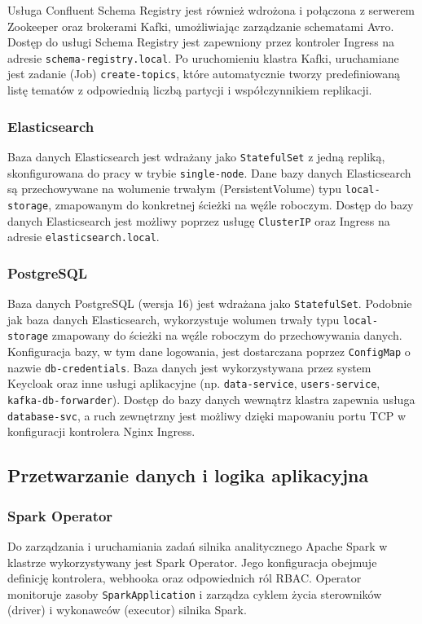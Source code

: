 Usługa Confluent Schema Registry jest również wdrożona i połączona z serwerem Zookeeper oraz brokerami Kafki, umożliwiając zarządzanie schematami Avro. Dostęp do usługi Schema Registry jest zapewniony przez kontroler Ingress na adresie \texttt{schema-registry.local}. Po uruchomieniu klastra Kafki, uruchamiane jest zadanie (Job) \texttt{create-topics}, które automatycznie tworzy predefiniowaną listę tematów z odpowiednią liczbą partycji i współczynnikiem replikacji.

\subsubsection{Elasticsearch}
Baza danych Elasticsearch jest wdrażany jako \texttt{StatefulSet} z jedną repliką, skonfigurowana do pracy w trybie \texttt{single-node}. Dane bazy danych Elasticsearch są przechowywane na wolumenie trwałym (PersistentVolume) typu \texttt{local-storage}, zmapowanym do konkretnej ścieżki na węźle roboczym. Dostęp do bazy danych Elasticsearch jest możliwy poprzez usługę \texttt{ClusterIP} oraz Ingress na adresie \texttt{elasticsearch.local}.

\subsubsection{PostgreSQL}
Baza danych PostgreSQL (wersja 16) jest wdrażana jako \texttt{StatefulSet}. Podobnie jak baza danych Elasticsearch, wykorzystuje wolumen trwały typu \texttt{local-storage} zmapowany do ścieżki na węźle roboczym do przechowywania danych. Konfiguracja bazy, w tym dane logowania, jest dostarczana poprzez \texttt{ConfigMap} o nazwie \texttt{db-credentials}. Baza danych jest wykorzystywana przez system Keycloak oraz inne usługi aplikacyjne (np. \texttt{data-service}, \texttt{users-service}, \texttt{kafka-db-forwarder}). Dostęp do bazy danych wewnątrz klastra zapewnia usługa \texttt{database-svc}, a ruch zewnętrzny jest możliwy dzięki mapowaniu portu TCP w konfiguracji kontrolera Nginx Ingress.

\subsection{Przetwarzanie danych i logika aplikacyjna}

\subsubsection{Spark Operator}
Do zarządzania i uruchamiania zadań silnika analitycznego Apache Spark w klastrze wykorzystywany jest Spark Operator. Jego konfiguracja obejmuje definicję kontrolera, webhooka oraz odpowiednich ról RBAC. Operator monitoruje zasoby \texttt{SparkApplication} i zarządza cyklem życia sterowników (driver) i wykonawców (executor) silnika Spark.

